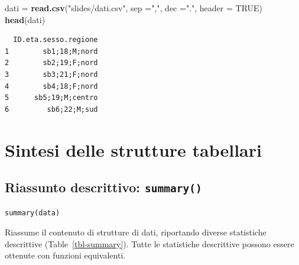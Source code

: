\documentclass[
  a4paper,
  DIV=11,
  numbers=noendperiod]{scrreprt}
\newenvironment{Shaded}{\begin{snugshade}}{\end{snugshade}}
\newcommand{\AttributeTok}[1]{\textcolor[rgb]{0.13,0.29,0.53}{#1}}
\newcommand{\ConstantTok}[1]{\textcolor[rgb]{0.56,0.35,0.01}{#1}}
\newcommand{\FunctionTok}[1]{\textcolor[rgb]{0.13,0.29,0.53}{\textbf{#1}}}
\newcommand{\NormalTok}[1]{#1}
\newcommand{\OtherTok}[1]{\textcolor[rgb]{0.56,0.35,0.01}{#1}}
\newcommand{\StringTok}[1]{\textcolor[rgb]{0.31,0.60,0.02}{#1}}
\begin{document}
\begin{Shaded}
\begin{Highlighting}[]
\NormalTok{dati }\OtherTok{=} \FunctionTok{read.csv}\NormalTok{(}\StringTok{"slides/dati.csv"}\NormalTok{, }
                \AttributeTok{sep =}\StringTok{","}\NormalTok{, }\AttributeTok{dec =}\StringTok{"."}\NormalTok{, }\AttributeTok{header =} \ConstantTok{TRUE}\NormalTok{)}
\FunctionTok{head}\NormalTok{(dati)}
\end{Highlighting}
\end{Shaded}

\begin{verbatim}
  ID.eta.sesso.regione
1        sb1;18;M;nord
2        sb2;19;F;nord
3        sb3;21;F;nord
4        sb4;18;F;nord
5      sb5;19;M;centro
6         sb6;22;M;sud
\end{verbatim}

\section{Sintesi delle strutture
tabellari}\label{sintesi-delle-strutture-tabellari}

\subsection{\texorpdfstring{Riassunto descrittivo:
\texttt{summary()}}{Riassunto descrittivo: summary()}}\label{riassunto-descrittivo-summary}

\begin{verbatim}
summary(data)
\end{verbatim}

Riassume il contenuto di strutture di dati, riportando diverse
statistiche descrittive (Table~\ref{tbl-summary}). Tutte le statistiche
descrittive possono essere ottenute con funzioni equivalenti.
\end{document}
